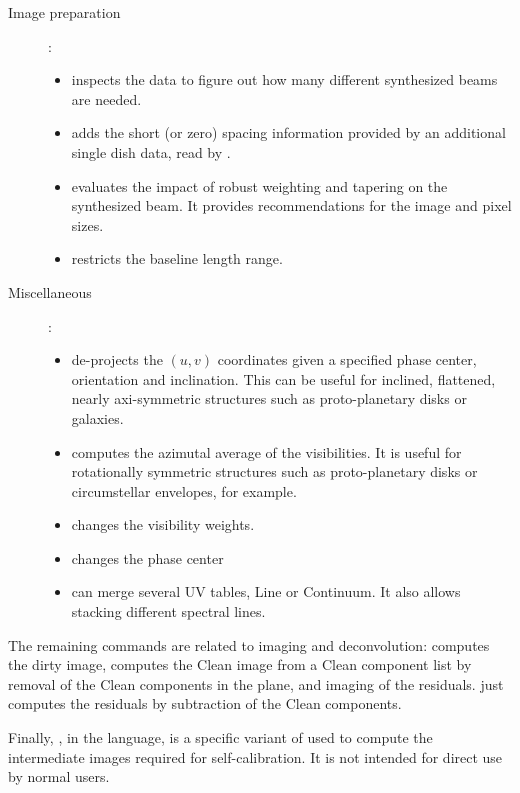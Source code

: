 \begin{description}
\item[Image preparation]:
\begin{itemize}\itemsep 0pt
\item {} inspects the \uv{} data to figure out how many
different synthesized beams are needed.
\item {} adds the short (or zero) spacing information provided by
an additional single dish data, read by .
\item {} evaluates the impact of robust weighting
and tapering on the synthesized beam. It provides recommendations for
the image and pixel sizes.
\item {} restricts the \uv{} baseline length range.
\end{itemize}

\item[Miscellaneous]:
\begin{itemize}\itemsep 0pt
\item {} de-projects the $(u,v)$ coordinates given
a specified phase center, orientation and inclination. This can be
useful for inclined, flattened, nearly axi-symmetric structures such as
proto-planetary disks or galaxies. 
\item {} computes the azimutal average of the 
visibilities. It is useful for rotationally symmetric structures such 
as proto-planetary disks or circumstellar envelopes, for example.
\item {} changes the visibility weights.
\item {} changes the phase center
\item {} can merge several UV tables, Line or Continuum.
It also allows stacking different spectral lines.
\end{itemize}

\end{description} 

The remaining  commands are related to imaging and 
deconvolution:  computes the dirty image, 
 computes the Clean image from a Clean component list 
by removal of the Clean components in the \uv{} plane, and imaging of 
the residuals.  just computes the residuals by 
subtraction of the Clean components. 

Finally, , in the  language, is a 
specific variant of  used to compute the intermediate 
images required for self-calibration. It is not intended for direct use 
by normal users.

